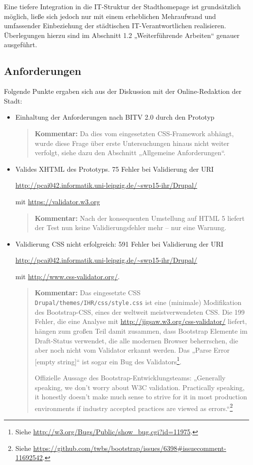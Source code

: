 \documentclass[11pt,a4paper,twoside]{article}
\newcommand{\kommentar}[1]{\begin{quote}\textbf{Kommentar:} #1 \end{quote}}
\begin{document}
Eine tiefere Integration in die IT-Struktur der Stadthomepage ist grundsätzlich
möglich, ließe sich jedoch nur mit einem erheblichen Mehraufwand und
umfassender Einbeziehung der städtischen IT-Verantwortlichen realisieren.
Überlegungen hierzu sind im Abschnitt 1.2 „Weiterführende Arbeiten“ genauer
ausgeführt.

\subsection*{Anforderungen}

Folgende Punkte ergaben sich aus der Diskussion mit der Online-Redaktion der
Stadt:
\begin{itemize}\itemsep0pt
\item Einhaltung der Anforderungen nach BITV 2.0 durch den Prototyp
  \kommentar{Da dies vom eingesetzten CSS-Framework abhängt, wurde diese Frage
    über erste Untersuchungen hinaus nicht weiter verfolgt, siehe dazu den
    Abschnitt „Allgemeine Anforderungen“.}
\item Valides XHTML des Prototyps. 75 Fehler bei Validierung der URI
  \begin{center}
    \url{http://pcai042.informatik.uni-leipzig.de/~swp15-ihr/Drupal/}
  \end{center}
  mit \url{https://validator.w3.org} 

\kommentar{Nach der konsequenten Umstellung auf HTML 5 liefert der Test nun
  keine Validierungsfehler mehr -- nur eine Warnung. }
\item Validierung CSS nicht erfolgreich: 591 Fehler bei Validierung der URI
  \begin{center}
    \url{http://pcai042.informatik.uni-leipzig.de/~swp15-ihr/Drupal/}
  \end{center}
  mit \url{http://www.css-validator.org/}. 

\kommentar{Das eingesetzte CSS \texttt{Drupal/themes/IHR/css/style.css} ist
  eine (minimale) Modifikation des Bootstrap-CSS, eines der weltweit
  meistverwendeten CSS. Die 199 Fehler, die eine Analyse mit
  \url{http://jigsaw.w3.org/css-validator/} liefert, hängen zum großen Teil
  damit zusammen, dass Bootstrap Elemente im Draft-Status verwendet, die alle
  modernen Browser beherrschen, die aber noch nicht vom Validator erkannt
  werden.  Das „Parse Error [empty string]“ ist sogar ein Bug des
  Validators\footnote{Siehe
    \url{http://w3.org/Bugs/Public/show_bug.cgi?id=11975}.}.

  Offizielle Aussage des Bootstrap-Entwicklungsteams: „Generally speaking, we
  don't worry about W3C validation. Practically speaking, it honestly doesn't
  make much sense to strive for it in most production environments if industry
  accepted practices are viewed as errors.“\footnote{Siehe
    \url{https://github.com/twbs/bootstrap/issues/6398#issuecomment-11692542}.}
  }


\end{itemize}
\end{document}

